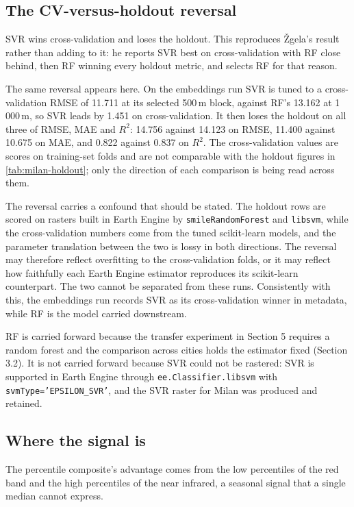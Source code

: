 \documentclass[11pt,a4paper]{article}
\newcommand{\Rsq}{$R^2$}
\begin{document}
\subsection{The CV-versus-holdout reversal}

SVR wins cross-validation and loses the holdout. This reproduces Žgela's result
\cite[p.~5]{zgela2026} rather than adding to it: he reports SVR best on cross-validation with
RF close behind, then RF winning every holdout metric, and selects RF for that
reason.

The same reversal appears here. On the embeddings run SVR is tuned to a
cross-validation RMSE of 11.711 at its selected 500\,m block, against RF's 13.162
at 1\,000\,m, so SVR leads by 1.451 on cross-validation. It then loses the holdout
on all three of RMSE, MAE and \Rsq{}: 14.756 against 14.123 on RMSE, 11.400
against 10.675 on MAE, and 0.822 against 0.837 on \Rsq{}. The cross-validation
values are scores on training-set folds and are not comparable with the holdout
figures in \cref{tab:milan-holdout}; only the direction of each comparison is
being read across them.

The reversal carries a confound that should be stated. The holdout rows are
scored on rasters built in Earth Engine by \texttt{smileRandomForest} and
\texttt{libsvm}, while the cross-validation numbers come from the tuned
scikit-learn models, and the parameter translation between the two is lossy in
both directions. The reversal may therefore reflect overfitting to the
cross-validation folds, or it may reflect how faithfully each Earth Engine
estimator reproduces its scikit-learn counterpart. The two cannot be separated
from these runs. Consistently with this, the embeddings run records SVR as its
cross-validation winner in metadata, while RF is the model carried downstream.

RF is carried forward because the transfer experiment in Section 5 requires a
random forest and the comparison across cities holds the estimator fixed
(Section 3.2). It is not carried forward because SVR could not be rastered: SVR
is supported in Earth Engine through \texttt{ee.Classifier.libsvm} \cite{chang2011libsvm} with
\texttt{svmType='EPSILON\_SVR'}, and the SVR raster for Milan was produced and
retained.

\subsection{Where the signal is}

The percentile composite's advantage comes from the low percentiles of the red
band and the high percentiles of the near infrared, a seasonal signal that a
single median cannot express.
\end{document}

